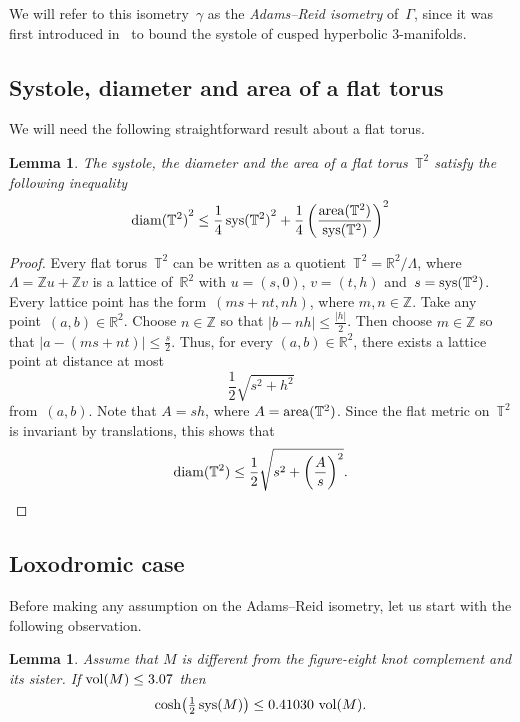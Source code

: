 \documentclass[11pt,reqno]{amsart}
\newtheorem{lemma}[theorem]{Lemma}
\theoremstyle{definition}
\numberwithin{equation}{section}
\newcommand\R {{\mathbb R}}
\newcommand\Z {{\mathbb Z}}
\newcommand\T {{\mathbb T}}
\DeclareMathOperator{\area}{{\rm area}}
\DeclareMathOperator{\vol}{{\rm vol}}
\DeclareMathOperator{\sys}{{\rm sys}}
\DeclareMathOperator{\diam}{{\rm diam}}
\numberwithin{equation}{section}
\begin{document}
\medskip

We will refer to this isometry~$\gamma$ as the \emph{Adams--Reid isometry} of~$\Gamma$, since it was first introduced in~\cite{adams-reid} to bound the systole of cusped hyperbolic $3$-manifolds.



\subsection{Systole, diameter and area of a flat torus}

We will need the following straightforward result about a flat torus.

\begin{lemma} \label{lem:torus}
The systole, the diameter and the area of a flat torus~$\T^2$ satisfy the following inequality
\[
{\diam(\T^2)}^2 \leq \frac{1}{4} \, {\sys(\T^2)}^2 + \frac{1}{4} \left( \frac{\area(\T^2)}{\sys(\T^2)} \right)^2
\]
\end{lemma}

\begin{proof}
Every flat torus~$\T^2$ can be written as a quotient~$\T^2=\R^2/\Lambda$, where $\Lambda=\Z u + \Z v$ is a lattice of~$\R^2$ with $u=(s,0)$, $v=(t,h)$ and~$s=\sys(\T^2)$.
Every lattice point has the form~$(ms+nt,nh)$, where $m,n \in \Z$.
Take any point~$(a,b) \in \R^2$.
Choose $n \in \Z$ so that $|b-nh| \leq \frac{|h|}{2}$.
Then choose $m \in \Z$ so that $|a-(ms+nt)| \leq \frac{s}{2}$.
Thus, for every $(a,b) \in \R^2$, there exists a lattice point at distance at most
\[
\frac{1}{2} \sqrt{s^2 + h^2}
\]
from~$(a,b)$.
Note that $A=sh$, where $A=\area(\T^2)$.
Since the flat metric on~$\T^2$ is invariant by translations, this shows that
\[
\diam(\T^2) \leq \frac{1}{2} \sqrt{s^2 + \left( \frac{A}{s} \right)^2}.
\]
\end{proof}



\subsection{Loxodromic case}
Before making any assumption on the Adams--Reid isometry, let us start with the following observation.

\begin{lemma} \label{lem:3.07}
Assume that $M$ is different from the figure-eight knot complement and its sister.
If $\vol(M) \leq 3.07$ then
\[
\cosh \!\left(\tfrac{1}{2} \sys(M) \right) \leq 0.41030 \, \vol(M).
\]
\end{lemma}
\end{document}
